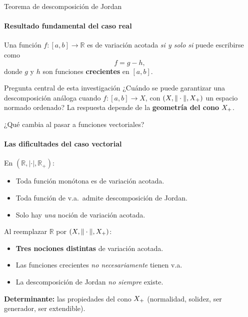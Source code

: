 
\begin{frame}[shrink=5]{Teorema de descomposición de Jordan}
\framesubtitle{Resultado fundamental del caso real}

\begin{theorem}[Jordan, 1881]
Una función $f:[a,b]\to\mathbb{R}$ es de variación acotada \emph{si y solo si}
puede escribirse como
\[
f = g - h,
\]
donde $g$ y $h$ son funciones \textbf{crecientes} en $[a,b]$.
\end{theorem}

\smallskip

\begin{alertblock}{Pregunta central de esta investigación}
¿Cuándo se puede garantizar una descomposición análoga cuando
$f:[a,b]\to X$, con $(X,\|\cdot\|,X_{+})$ un espacio normado ordenado?
La respuesta depende de la \textbf{geometría del cono} $X_{+}$.
\end{alertblock}


\end{frame}


\begin{frame}{¿Qué cambia al pasar a funciones vectoriales?}
\framesubtitle{Las dificultades del caso vectorial}

En $(\mathbb{R},|\cdot|,\mathbb{R}_{+})$:
\begin{itemize}
  \item[\checkmark] Toda función monótona es de variación acotada.
  \item[\checkmark] Toda función de v.a.\ admite descomposición de Jordan.
  \item[\checkmark] Solo hay \emph{una} noción de variación acotada.
\end{itemize}

\medskip

Al reemplazar $\mathbb{R}$ por $(X,\|\cdot\|,X_{+})$:
\begin{itemize}
  \item[$\times$] \textbf{Tres nociones distintas} de variación acotada.
  \item[$\times$] Las funciones crecientes \emph{no necesariamente} tienen v.a.
  \item[$\times$] La descomposición de Jordan \emph{no siempre} existe.
\end{itemize}

\smallskip

\textbf{Determinante:} las propiedades del cono $X_{+}$
(normalidad, solidez, ser generador, ser extendible).

\end{frame}
